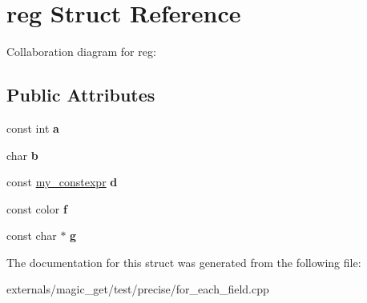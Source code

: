 \hypertarget{structreg}{}\section{reg Struct Reference}
\label{structreg}


Collaboration diagram for reg\+:
\subsection*{Public Attributes}
\begin{DoxyCompactItemize}
\item 
\mbox{\label{structreg_a3611c637be94f381e4724af4c4e60d20}} 
const int {\bfseries a}
\item 
\mbox{\label{structreg_ab933bf7300ce8c43d61d21b124c74c81}} 
char {\bfseries b}
\item 
\mbox{\label{structreg_a024b2296789f681c5933b8840a32628d}} 
const \mbox{\hyperlink{structmy__constexpr}{my\+\_\+constexpr}} {\bfseries d}
\item 
\mbox{\label{structreg_a25cf50fe0f09ef288ad281cf809aa87e}} 
const color {\bfseries f}
\item 
\mbox{\label{structreg_a5b50407dab9a7b9ee60352c59b031d01}} 
const char $\ast$ {\bfseries g}
\end{DoxyCompactItemize}


The documentation for this struct was generated from the following file\+:\begin{DoxyCompactItemize}
\item 
externals/magic\+\_\+get/test/precise/for\+\_\+each\+\_\+field.\+cpp\end{DoxyCompactItemize}
